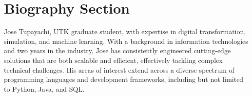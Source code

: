 \documentclass[lettersize,journal]{IEEEtran}
\begin{document}












\newpage

\section{Biography Section}
 
\vspace{11pt}

\begin{IEEEbiography}{Jose Tupayachi}, UTK graduate student, with expertise in digital transformation, simulation, and machine learning. With a background in information technologies and two years in the industry, Jose has consistently engineered cutting-edge solutions that are both scalable and efficient, effectively tackling complex technical challenges. His areas of interest extend across a diverse spectrum of programming languages and development frameworks, including but not limited to Python, Java, and SQL.
\end{IEEEbiography}
\end{document}
